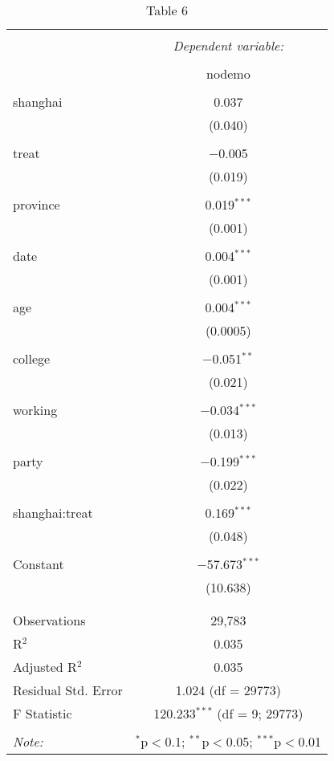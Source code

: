 \documentclass[
]{article}
\begin{document}
\begin{table}[!htbp] \centering 
  \caption{Table 6} 
  \label{} 
\begin{tabular}{@{\extracolsep{5pt}}lc} 
\\[-1.8ex]\hline 
\hline \\[-1.8ex] 
 & \multicolumn{1}{c}{\textit{Dependent variable:}} \\ 
\cline{2-2} 
\\[-1.8ex] & nodemo \\ 
\hline \\[-1.8ex] 
 shanghai & 0.037 \\ 
  & (0.040) \\ 
  & \\ 
 treat & $-$0.005 \\ 
  & (0.019) \\ 
  & \\ 
 province & 0.019$^{***}$ \\ 
  & (0.001) \\ 
  & \\ 
 date & 0.004$^{***}$ \\ 
  & (0.001) \\ 
  & \\ 
 age & 0.004$^{***}$ \\ 
  & (0.0005) \\ 
  & \\ 
 college & $-$0.051$^{**}$ \\ 
  & (0.021) \\ 
  & \\ 
 working & $-$0.034$^{***}$ \\ 
  & (0.013) \\ 
  & \\ 
 party & $-$0.199$^{***}$ \\ 
  & (0.022) \\ 
  & \\ 
 shanghai:treat & 0.169$^{***}$ \\ 
  & (0.048) \\ 
  & \\ 
 Constant & $-$57.673$^{***}$ \\ 
  & (10.638) \\ 
  & \\ 
\hline \\[-1.8ex] 
Observations & 29,783 \\ 
R$^{2}$ & 0.035 \\ 
Adjusted R$^{2}$ & 0.035 \\ 
Residual Std. Error & 1.024 (df = 29773) \\ 
F Statistic & 120.233$^{***}$ (df = 9; 29773) \\ 
\hline 
\hline \\[-1.8ex] 
\textit{Note:}  & \multicolumn{1}{r}{$^{*}$p$<$0.1; $^{**}$p$<$0.05; $^{***}$p$<$0.01} \\ 
\end{tabular} 
\end{table}
\end{document}
